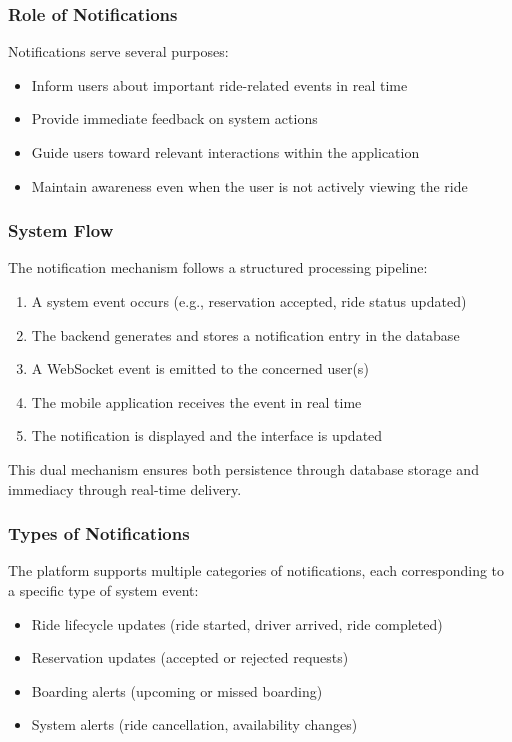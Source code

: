 \subsubsection{Role of Notifications}

Notifications serve several purposes:

\begin{itemize}
    \item Inform users about important ride-related events in real time
    \item Provide immediate feedback on system actions
    \item Guide users toward relevant interactions within the application
    \item Maintain awareness even when the user is not actively viewing the ride
\end{itemize}

\subsubsection{System Flow}

The notification mechanism follows a structured processing pipeline:

\begin{enumerate}
    \item A system event occurs (e.g., reservation accepted, ride status updated)
    \item The backend generates and stores a notification entry in the database
    \item A WebSocket event is emitted to the concerned user(s)
    \item The mobile application receives the event in real time
    \item The notification is displayed and the interface is updated
\end{enumerate}

This dual mechanism ensures both persistence through database storage and immediacy through real-time delivery.

\subsubsection{Types of Notifications}

The platform supports multiple categories of notifications, each corresponding to a specific type of system event:

\begin{itemize}
    \item Ride lifecycle updates (ride started, driver arrived, ride completed)
    \item Reservation updates (accepted or rejected requests)
    \item Boarding alerts (upcoming or missed boarding)
    \item System alerts (ride cancellation, availability changes)
\end{itemize}

